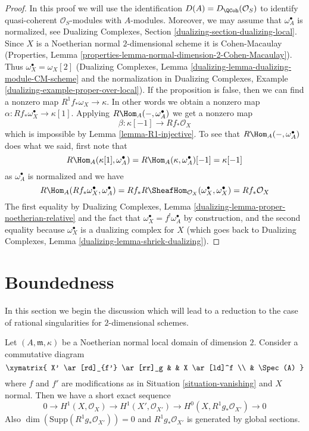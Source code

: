 \begin{proof}
In this proof we will use the identification $D(A) = D_\QCoh(\mathcal{O}_S)$
to identify quasi-coherent $\mathcal{O}_S$-modules with $A$-modules.
Moreover, we may assume that $\omega_A^\bullet$ is normalized, see
Dualizing Complexes, Section \ref{dualizing-section-dualizing-local}.
Since $X$ is a Noetherian normal $2$-dimensional scheme
it is Cohen-Macaulay (Properties, Lemma
\ref{properties-lemma-normal-dimension-2-Cohen-Macaulay}).
Thus $\omega_X^\bullet = \omega_X[2]$ (Dualizing Complexes, Lemma
\ref{dualizing-lemma-dualizing-module-CM-scheme} and the
normalization in Dualizing Complexes, Example
\ref{dualizing-example-proper-over-local}).
If the proposition is false, then we can find a nonzero map
$R^1f_*\omega_X \to \kappa$. In other words we obtain a nonzero map
$\alpha : Rf_*\omega_X^\bullet \to \kappa[1]$.
Applying $R\Hom_A(-, \omega_A^\bullet)$ we get a nonzero map
$$
\beta : \kappa[-1] \longrightarrow Rf_*\mathcal{O}_X
$$
which is impossible by Lemma \ref{lemma-R1-injective}.
To see that $R\Hom_A(-, \omega_A^\bullet)$ does what we said, first
note that
$$
R\Hom_A(\kappa[1], \omega_A^\bullet) =
R\Hom_A(\kappa, \omega_A^\bullet)[-1] =
\kappa[-1]
$$
as $\omega_A^\bullet$ is normalized and we have
$$
R\Hom_A(Rf_*\omega_X^\bullet, \omega_A^\bullet) =
Rf_*R\SheafHom_{\mathcal{O}_X}(\omega_X^\bullet, \omega_X^\bullet) =
Rf_*\mathcal{O}_X
$$
The first equality by
Dualizing Complexes, Lemma \ref{dualizing-lemma-proper-noetherian-relative}
and the fact that $\omega_X^\bullet = f^!\omega_A^\bullet$
by construction, and the second equality because $\omega_X^\bullet$
is a dualizing complex for $X$ (which goes back to
Dualizing Complexes, Lemma \ref{dualizing-lemma-shriek-dualizing}).
\end{proof}





\section{Boundedness}
\label{section-bounded}

\noindent
In this section we begin the discussion which will lead to a reduction to
the case of rational singularities for $2$-dimensional schemes.

\begin{lemma}
\label{lemma-exact-sequence}
Let $(A, \mathfrak m, \kappa)$ be a Noetherian normal local domain
of dimension $2$. Consider a commutative diagram
$$
\xymatrix{
X' \ar[rd]_{f'} \ar[rr]_g & & X \ar[ld]^f \\
& \Spec(A)
}
$$
where $f$ and $f'$ are modifications as in Situation \ref{situation-vanishing}
and $X$ normal. Then we have a short exact sequence
$$
0 \to H^1(X, \mathcal{O}_X) \to H^1(X', \mathcal{O}_{X'}) \to
H^0(X, R^1g_*\mathcal{O}_{X'}) \to 0
$$
Also $\dim(\text{Supp}(R^1g_*\mathcal{O}_{X'})) = 0$
and $R^1g_*\mathcal{O}_{X'}$ is generated by global sections.
\end{lemma}

